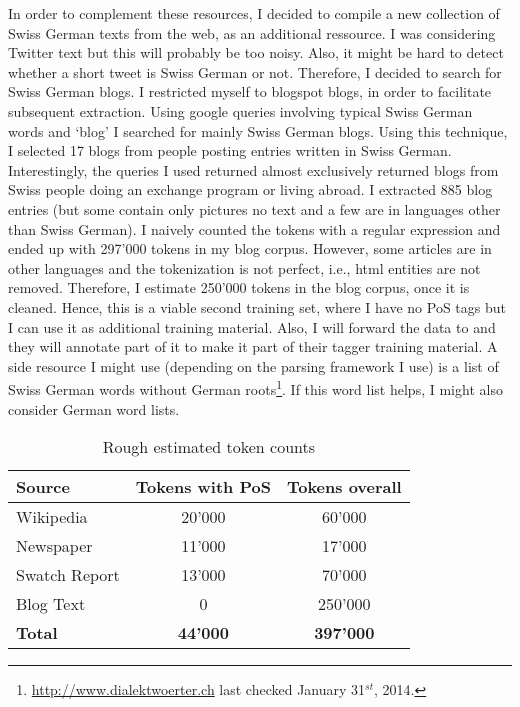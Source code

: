 \documentclass[11pt,letterpaper]{article}
\begin{document}
In order to complement these resources, I decided to compile a new collection of Swiss German texts from the web, as an additional ressource. I was considering Twitter text but this will probably be too noisy. Also, it might be hard to detect whether a short tweet is Swiss German or not. Therefore, I decided to search for Swiss German blogs. I restricted myself to blogspot blogs, in order to facilitate subsequent extraction. Using google queries involving typical Swiss German words and `blog' I searched for mainly Swiss German blogs. Using this technique, I selected 17 blogs from people posting entries written in Swiss German. Interestingly, the queries I used returned almost exclusively returned blogs from Swiss people doing an exchange program or living abroad. I extracted 885 blog entries (but some contain only pictures no text and a few are in languages other than Swiss German). I naively counted the tokens with a regular expression and ended up with 297'000 tokens in my blog corpus. However, some articles are in other languages and the tokenization is not perfect, i.e., html entities are not removed. Therefore, I estimate 250'000 tokens in the blog corpus, once it is cleaned. Hence, this is a viable second training set, where I have no PoS tags but I can use it as additional training material. Also, I will forward the data to \citet{AH14} and they will annotate part of it to make it part of their tagger training material. A side resource I might use (depending on the parsing framework I use) is a list of Swiss German words without German roots\footnote{\url{http://www.dialektwoerter.ch} last checked January 31$^{st}$, 2014.}. If this word list helps, I might also consider German word lists.

\begin{table}
\center
\begin{tabular}{ | l | c | c | }
   \hline
   \textbf{Source} & \textbf{Tokens with PoS} & \textbf{Tokens overall} \\ \hline
   Wikipedia & 20'000 & 60'000 \\
   Newspaper & 11'000 & 17'000 \\ 
   Swatch Report & 13'000 & 70'000 \\
   Blog Text & 0 & 250'000 \\ \hline
   \textbf{Total} & \textbf{44'000} & \textbf{397'000} \\ \hline
\end{tabular}
\caption{Rough estimated token counts}
\end{table}
\end{document}

